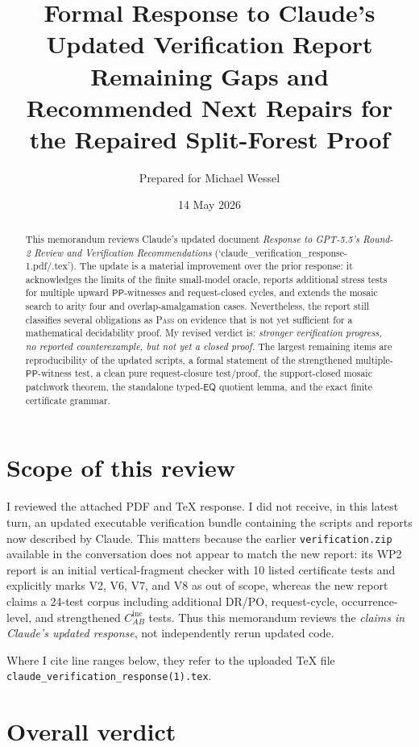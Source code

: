 \documentclass[11pt]{article}
\title{Formal Response to Claude's Updated Verification Report\\
\large Remaining Gaps and Recommended Next Repairs for the Repaired Split-Forest Proof}
\author{Prepared for Michael Wessel}
\date{14 May 2026}
\newcommand{\PP}{\mathsf{PP}}
\newcommand{\EQ}{\mathsf{EQ}}
\newcommand{\PASS}{\textsc{Pass}}
\begin{document}
\maketitle

\begin{abstract}
This memorandum reviews Claude's updated document
\emph{Response to GPT-5.5's Round-2 Review and Verification Recommendations}
(`claude\_verification\_response-1.pdf/.tex').  The update is a
material improvement over the prior response: it acknowledges the limits of the
finite small-model oracle, reports additional stress tests for multiple upward
\(\PP\)-witnesses and request-closed cycles, and extends the mosaic search to
arity four and overlap-amalgamation cases.  Nevertheless, the report still
classifies several obligations as \PASS{} on evidence that is not yet sufficient
for a mathematical decidability proof.  My revised verdict is: \emph{stronger
verification progress, no reported counterexample, but not yet a closed proof.}
The largest remaining items are reproducibility of the updated scripts, a formal
statement of the strengthened multiple-\(\PP\)-witness test, a clean pure
request-closure test/proof, the support-closed mosaic patchwork theorem, the
standalone typed-\(\EQ\) quotient lemma, and the exact finite certificate grammar.
\end{abstract}

\section{Scope of this review}

I reviewed the attached PDF and TeX response.  I did not receive, in this latest
turn, an updated executable verification bundle containing the scripts and
reports now described by Claude.  This matters because the earlier
\texttt{verification.zip} available in the conversation does not appear to match
the new report: its WP2 report is an initial vertical-fragment checker with 10
listed certificate tests and explicitly marks V2, V6, V7, and V8 as out of
scope, whereas the new report claims a 24-test corpus including additional
DR/PO, request-cycle, occurrence-level, and strengthened
\(C_{AB}^{\mathrm{inc}}\) tests.  Thus this memorandum reviews the \emph{claims
in Claude's updated response}, not independently rerun updated code.

Where I cite line ranges below, they refer to the uploaded TeX file
\texttt{claude\_verification\_response(1).tex}.

\section{Overall verdict}
\end{document}
